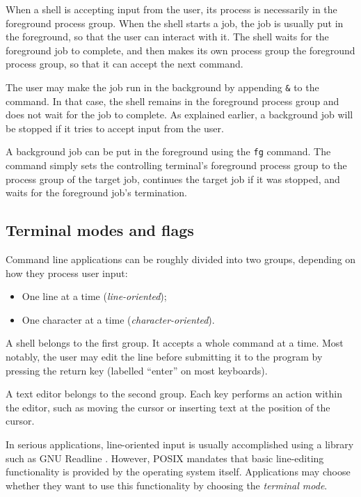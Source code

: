 \documentclass[shortabstract, manyadvisors, english, mgr]{iithesis}
\begin{document}
When a shell is accepting input from the user, its process is necessarily in the
foreground process group. When the shell starts a job, the job is usually put in
the foreground, so that the user can interact with it. The shell waits for the
foreground job to complete, and then makes its own process group the foreground
process group, so that it can accept the next command.

The user may make the job run in the background by appending \texttt{\&} to the
command. In that case, the shell remains in the foreground process group and
does not wait for the job to complete. As explained earlier, a background job
will be stopped if it tries to accept input from the user.

A background job can be put in the foreground using the \texttt{fg} command. The
command simply sets the controlling terminal's foreground process group to the
process group of the target job, continues the target job if it was stopped, and
waits for the foreground job's termination.

\subsection{Terminal modes and flags}

Command line applications can be roughly divided into two groups, depending on
how they process user input:
\begin{itemize}
  \item{One line at a time (\textit{line-oriented});}
  \item{One character at a time (\textit{character-oriented}).}
\end{itemize}

A shell belongs to the first group. It accepts a whole command at a time. Most
notably, the user may edit the line before submitting it to the program by
pressing the return key (labelled ``enter'' on most keyboards).

A text editor belongs to the second group. Each key performs an action within
the editor, such as moving the cursor or inserting text at the position of the
cursor.

In serious applications, line-oriented input is usually accomplished using a
library such as GNU Readline \cite{readline}. However, POSIX mandates that basic
line-editing functionality is provided by the operating system itself.
Applications may choose whether they want to use this functionality by choosing
the \textit{terminal mode}.
\end{document}
